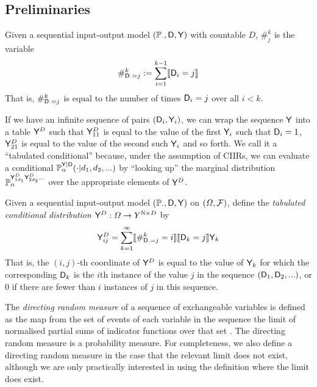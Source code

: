 \subsection{Preliminaries}\label{sec:rep_theorem_background}

\begin{definition}\label{def:count_of_inputs}
Given a sequential input-output model $(\mathbb{P}_\cdot,\mathsf{D},\mathsf{Y})$ with countable $D$, $\#_{j}^k$ is the variable
\begin{align}
    \#_{\mathsf{D}_{\cdot}=j}^k := \sum_{i=1}^{k-1} \llbracket \mathsf{D}_i = j \rrbracket
\end{align}
That is, $\#_{\mathsf{D}_{\cdot}=j}^k$ is equal to the number of times $\mathsf{D}_i=j$ over all $i<k$.
\end{definition}

If we have an infinite sequence of pairs $(\mathsf{D}_i,\mathsf{Y}_i)$, we can wrap the sequence $\mathsf{Y}$ into a table $\mathsf{Y}^D$ such that $\mathsf{Y}^D_{11}$ is equal to the value of the first $\mathsf{Y}_i$ such that $\mathsf{D}_i=1$, $\mathsf{Y}^D_{21}$ is equal to the value of the second such $\mathsf{Y}_i$ and so forth. We call it a ``tabulated conditional'' because, under the assumption of CIIRs, we can evaluate a conditional $\mathbb{P}_\alpha^{\mathsf{Y}|\mathsf{D}}(\cdot|d_1,d_2,...)$ by ``looking up'' the marginal distribution $\mathbb{P}_\alpha^{\mathsf{Y}^D_{1 d_1}\mathsf{Y}^D_{2 d_2}...}$ over the appropriate elements of $\mathsf{Y}^D$.

\begin{definition}\label{def:tab_cd}
Given a sequential input-output model $(\mathbb{P}_\cdot,\mathsf{D},\mathsf{Y})$ on $(\Omega,\mathcal{F})$, define the \emph{tabulated conditional distribution} $\mathsf{Y}^D:\Omega\to Y^{\mathbb{N}\times D}$ by
\begin{align}
    \mathsf{Y}^D_{ij} = \sum_{k=1}^{\infty} \llbracket \#_{\mathsf{D}_{\cdot}=j}^k = i\rrbracket \llbracket \mathsf{D}_k = j \rrbracket \mathsf{Y}_k
\end{align}
That is, the $(i,j)$-th coordinate of $\mathsf{Y}^D$ is equal to the value of $\mathsf{Y}_k$ for which the corresponding $\mathsf{D}_k$ is the $i$th instance of the value $j$ in the sequence $(\mathsf{D}_1,\mathsf{D}_2,...)$, or 0 if there are fewer than $i$ instances of $j$ in this sequence.
\end{definition}

The \emph{directing random measure} of a sequence of exchangeable variables is defined as the map from the set of events of each variable in the sequence the limit of normalised partial sums of indicator functions over that set \citep{kallenberg_basic_2005}. The directing random measure is a probability measure. For completeness, we also define a directing random measure in the case that the relevant limit does not exist, although we are only practically interested in using the definition where the limit does exist.

